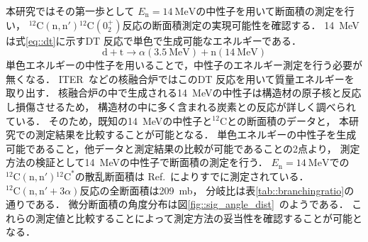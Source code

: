 \documentclass[../master]{subfiles}
\begin{document}
本研究ではその第一歩として
$E_{\text{n}} = \SI{14}{\mega\electronvolt}$の中性子を用いて断面積の測定を行い，
${}^{12}\mathrm{C}(\mathrm{n},\mathrm{n}'){}^{12}\mathrm{C} (0_2^+)$反応の断面積測定の実現可能性を確認する．
\SI{14}{\mega\electronvolt}は式\eqref{eq::dt}に示すDT 反応で単色で生成可能なエネルギーである．
\begin{equation}
  \mathrm{d} + \mathrm{t} \rightarrow \alpha (\SI{3.5}{\mega\electronvolt}) + \mathrm{n} (\SI{14}{\mega\electronvolt})
  \label{eq::dt}
\end{equation}
単色エネルギーの中性子を用いることで，中性子のエネルギー測定を行う必要が無くなる．
ITER~\cite{iter}などの核融合炉ではこのDT 反応を用いて質量エネルギーを取り出す．
核融合炉の中で生成される\SI{14}{\mega\electronvolt}の中性子は構造材の原子核と反応し損傷させるため，
構造材の中に多く含まれる炭素との反応が詳しく調べられている．
そのため，既知の\SI{14}{\mega\electronvolt}の中性子と${}^{12}\mathrm{C}$との断面積のデータと，
本研究での測定結果を比較することが可能となる．
単色エネルギーの中性子を生成可能であること，他データと測定結果の比較が可能であることの2点より，
測定方法の検証として\SI{14}{\mega\electronvolt}の中性子で断面積の測定を行う．
$E_{\text{n}}=\SI{14}{\mega\electronvolt}$での${}^{12}\mathrm{C}(\mathrm{n},\mathrm{n}'){}^{12}\mathrm{C}^{*}$の散乱断面積は
Ref.~\cite{takahashietal,kondoetal}によりすでに測定されている．
${}^{12}\mathrm{C}(\mathrm{n},\mathrm{n}'+3\alpha)$反応の全断面積は\SI{209}{\milli\barn}，
分岐比は表\ref{tab::branchingratio}の通りである．
微分断面積の角度分布は図\ref{fig::sig_angle_dist}~\cite{kondoetal}のようである．
これらの測定値と比較することによって測定方法の妥当性を確認することが可能となる．
\end{document}
